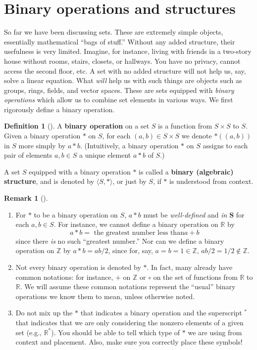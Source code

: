 \documentclass[10pt,]{book}
\newcommand{\terminology}[1]{\textbf{#1}}
\theoremstyle{plain}
\theoremstyle{definition}
\newtheorem{definition}[theorem]{Definition}
\theoremstyle{definition}
\newtheorem{remark}[theorem]{Remark}
\theoremstyle{definition}
\theoremstyle{definition}
\numberwithin{equation}{section}
\def\Z{\mathbb{Z}}
\def\R{\mathbb{R}}
\begin{document}
\section[{Binary operations and structures}]{Binary operations and structures}\label{binops}
So far we have been discussing sets. These are extremely simple objects, essentially mathematical ``bags of stuff.'' Without any added structure, their usefulness is very limited. Imagine, for instance, living with friends in a two-story house without rooms, stairs, closets, or hallways. You have no privacy, cannot access the second floor, etc. A set with no added structure will not help us, say, solve a linear equation. What \emph{will} help us with such things are objects such as groups, rings, fields, and vector spaces. These are sets equipped with \emph{binary operations} which allow us to combine set elements in various ways. We first rigorously define a binary operation.%
\begin{definition}[{}]\label{definition-14}
\label{notation-30}
A \terminology{binary operation} on a set \(S\) is a function from \(S\times S\) to \(S\). Given a binary operation \(*\) on \(S\), for each \((a,b)\in S\times S\) we denote \(*((a,b))\) in \(S\) more simply by \(a*b\). (Intuitively, a binary operation \(*\) on \(S\) assigns to each pair of elements \(a,b \in S\) a unique element \(a*b\) of \(S\).)%
\par
A set \(S\) equipped with a binary operation \(*\) is called a \terminology{binary (algebraic) structure}, and is denoted by \(\langle S,*\rangle\), or just by \(S\), if \(*\) is understood from context.%
\end{definition}
\begin{remark}[]\label{remark-5}
\leavevmode%
\begin{enumerate}
\item\hypertarget{li-53}{}For \(*\) to be a binary operation on \(S\), \(a*b\) must be \emph{well-defined} and \emph{in} \(\mathbf{S}\) for each \(a,b\in S\). For instance, we cannot define a binary operation on \(\R\) by%
\begin{equation*}
a*b=\text{ the greatest number less than
\(a+b\)}
\end{equation*}
since there \emph{is}  no such ``greatest number.'' Nor can we define a binary operation on \(\Z\) by \(a*b=ab/2\), since for, say, \(a=b=1 \in \Z\), \(ab/2=1/2 \not\in \Z\).%
\item\hypertarget{li-54}{}Not every binary operation is denoted by \(*\).  In fact, many already have common notations: for instance, \(+\) on \(\Z\) or \(\circ\) on the set of functions from \(\R\) to \(\R\). We will assume these common notations represent the ``usual'' binary operations we know them to mean, unless otherwise noted.%
\item\hypertarget{li-55}{}Do not mix up the \(*\) that indicates a binary operation and the superscript \(^*\) that indicates that we are only considering the nonzero elements of a given set (e.g., \(\R^*\)). You should be able to tell which type of \(*\) we are using from context and placement. Also, make sure you correctly place these symbols!%
\end{enumerate}
%
\end{remark}
\end{document}

